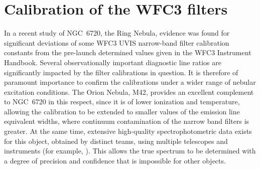 \documentclass[preprint]{aastex}
\begin{document}





\clearpage
\appendix

\section{Calibration of the WFC3 filters}

In a recent study \citep{ODell:2013b} of NGC~6720, the Ring Nebula,
evidence was found for significant deviations of some WFC3 UVIS
narrow-band filter calibration constants from the pre-launch
determined values given in the WFC3 Instrument Handbook.  Several
observationally important diagnostic line ratios are significantly
impacted by the filter calibrations in question.  It is therefore of
paramount importance to confirm the calibrations under a wider range
of nebular excitation conditions.  The Orion Nebula, M42, provides an
excellent complement to NGC~6720 in this respect, since it is of lower
ionization and temperature, allowing the calibration to be extended to
smaller values of the emission line equivalent widths, where continuum
contamination of the narrow band filters is greater.  At the same
time, extensive high-quality spectrophotometric data exists for this object,
obtained by distinct teams, using multiple telescopes and instruments
(for example, \citealp{Mesa-Delgado:2008b, ODell:2010a}).  This allows
the true spectrum to be determined with a degree of precision and
confidence that is impossible for other objects.


\end{document}
